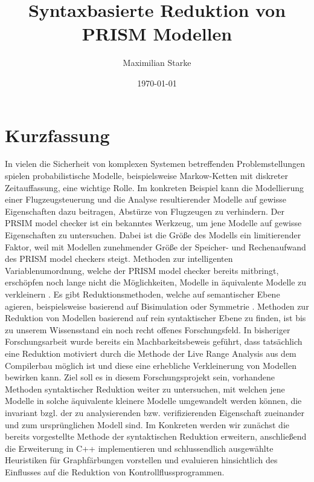 \documentclass[a4paper]{article}
\title{Syntaxbasierte Reduktion von PRISM Modellen}
\author{Maximilian Starke}
\affil{Fakultät für Informatik, Technische Universität Dresden}
\date{\today}
\newcommand{\mcpl}{Markow-Ketten}
\theoremstyle{nonumberplain}
\begin{document}
\maketitle
\vspace{3em}
\tableofcontents
\pagebreak

\section{Kurzfassung}

In vielen die Sicherheit von komplexen Systemen betreffenden Problemstellungen spielen probabilistische Modelle, beispielsweise \mcpl{} mit diskreter Zeitauffassung, eine wichtige Rolle. Im konkreten Beispiel kann die Modellierung einer Flugzeugsteuerung und die Analyse resultierender Modelle auf gewisse Eigenschaften dazu beitragen, Abstürze von Flugzeugen zu verhindern.
Der PRSIM model checker \cite{KNP11} ist ein bekanntes Werkzeug, um jene Modelle auf gewisse Eigenschaften zu untersuchen. Dabei ist die Größe des Modells ein limitierender Faktor, weil mit Modellen zunehmender Größe der Speicher- und Rechenaufwand des PRISM model checkers steigt.
Methoden zur intelligenten Variablenumordnung, welche der PRISM model checker bereits mitbringt, erschöpfen noch lange nicht die Möglichkeiten, Modelle in äquivalente Modelle zu verkleinern \cite{dubslaff2019breaking}.
Es gibt Reduktionsmethoden, welche auf semantischer Ebene agieren, beispielsweise basierend auf Bisimulation \cite{GIVAN2003163} oder Symmetrie \cite{symmetry}.
Methoden zur Reduktion von Modellen basierend auf rein syntaktischer Ebene zu finden, ist bis zu unserem Wissensstand ein noch recht offenes Forschungsfeld.
In bisheriger Forschungsarbeit \cite{dubslaff2019breaking} wurde bereits ein Machbarkeitsbeweis geführt, dass tatsächlich eine Reduktion motiviert durch die Methode der Live Range Analysis aus dem Compilerbau möglich ist und diese eine erhebliche Verkleinerung von Modellen bewirken kann.
Ziel soll es in diesem Forschungsprojekt sein, vorhandene Methoden syntaktischer Reduktion weiter zu untersuchen, mit welchen jene Modelle in solche äquivalente kleinere Modelle umgewandelt werden können, die invariant bzgl. der zu analysierenden bzw. verifizierenden Eigenschaft zueinander und zum ursprünglichen Modell sind.
Im Konkreten werden wir zunächst die bereits vorgestellte Methode der syntaktischen Reduktion \cite{dubslaff2019breaking} erweitern, anschließend die Erweiterung in C++ implementieren und schlussendlich ausgewählte Heuristiken für Graphfärbungen vorstellen und evaluieren hinsichtlich des Einflusses auf die Reduktion von Kontrollflussprogrammen.
\end{document}
